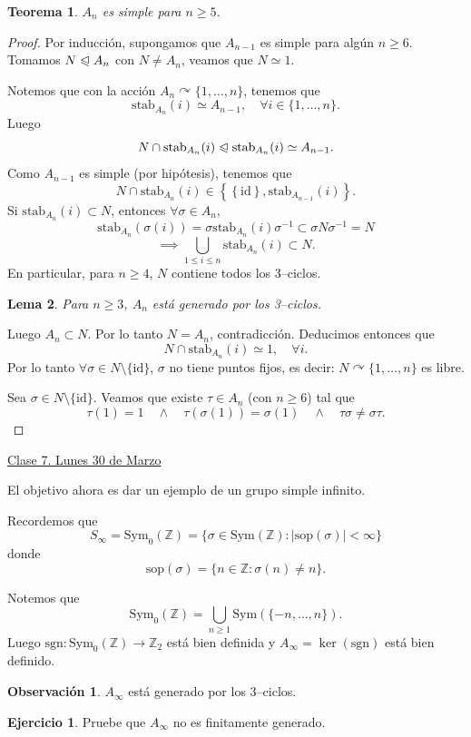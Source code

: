 \documentclass{article}
\newtheorem{theorem}{Teorema}[subsection]
\newtheorem{lemma}[theorem]{Lema}
\theoremstyle{definition}
\newtheorem{exercise}{Ejercicio}
\newtheorem*{obs}{Observación}
\theoremstyle{remark}
\numberwithin{equation}{section}
\newcommand{\Z}{\mathbb{Z}}
\newcommand{\oo}{\infty}
\newcommand{\acts}{\curvearrowright}
\newcommand{\normal}{\trianglelefteqslant}
\newcommand{\sgn}{\mathrm{sgn}}
\newcommand{\id}{\mathrm{id}}
\newcommand{\Sym}{\mathrm{Sym}}
\newcommand{\stab}{\mathrm{stab}}
\newcommand{\sop}{\mathrm{sop}}
\newcommand{\abs}[1]{\left| #1 \right|}
\newcommand{\set}[1]{\left\{ #1 \right\}}
\newcommand{\fecha}[1]{\begin{flushright} \underline{#1} \end{flushright}}
\begin{document}
\begin{theorem}
  $A_n$ es simple para $n \geq 5$.
\end{theorem}
\begin{proof}
  Por inducción, supongamos que $A_{n-1}$ es simple para algún $n \geq 6$.
  Tomamos $N \normal A_n$ con $N \neq A_n$, veamos que $N \simeq 1$.

  Notemos que con la acción $A_n \acts \{1,\dots,n\}$, tenemos que $$\stab_{A_n}(i) \simeq A_{n-1}, \quad \forall i \in \{1,\dots,n\}.$$
  Luego $$N \cap \stab_{A_n}(i) \normal \stab_{A_n}(i) \simeq A_{n-1}.$$
  Como $A_{n-1}$ es simple (por hipótesis), tenemos que
  \[N \cap \stab_{A_n}(i) \in \set{\set{\id}, \stab_{A_{n-1}}(i)}.\]
  Si $\stab_{A_n}(i) \subset N$, entonces $\forall \sigma \in A_n$,
  \[\stab_{A_n}(\sigma(i)) = \sigma \stab_{A_n}(i) \sigma^{-1} \subset \sigma N \sigma^{-1} = N\]
  \[\implies \bigcup_{1 \leq i \leq n} \stab_{A_n}(i) \subset N.\]
  En particular, para $n \geq 4$, $N$ contiene todos los 3--ciclos.
  \begin{lemma}
    Para $n \geq 3$, $A_n$ está generado por los 3--ciclos.
  \end{lemma}
  Luego $A_n \subset N$. Por lo tanto $N = A_n$, contradicción. Deducimos entonces que
  \[N \cap \stab_{A_n}(i) \simeq 1, \quad \forall i.\]
  Por lo tanto $\forall \sigma \in N \setminus \{\id\}$, $\sigma$ no tiene puntos fijos, es decir: $N \acts \{1,\dots,n\}$ es libre.

  Sea $\sigma \in N \setminus \{\id\}$. Veamos que existe $\tau \in A_n$ (con $n \geq 6$) tal que
  \[\tau(1) = 1 \quad\land\quad \tau(\sigma(1)) = \sigma(1) \quad\land\quad \tau\sigma \neq \sigma\tau.\]
\end{proof}

\fecha{Clase 7. Lunes 30 de Marzo}

El objetivo ahora es dar un ejemplo de un grupo simple infinito.

Recordemos que
\[S_\oo = \Sym_0(\Z) = \{\sigma \in \Sym(\Z) \colon \abs{\sop(\sigma)} < \oo\}\]
donde $$\sop(\sigma) = \{n \in \Z \colon \sigma(n) \neq n\}.$$

Notemos que
\[\Sym_0(\Z) = \bigcup_{n \geq 1} \Sym(\{-n, \dots, n\}).\]
Luego $\sgn \colon \Sym_0(\Z) \to \Z_2$ está bien definida y $A_\oo = \ker(\sgn)$ está bien definido.

\begin{obs}
  $A_\oo$ está generado por los 3--ciclos.
\end{obs}

\begin{exercise}
  Pruebe que $A_\oo$ no es finitamente generado.
\end{exercise}
\end{document}
